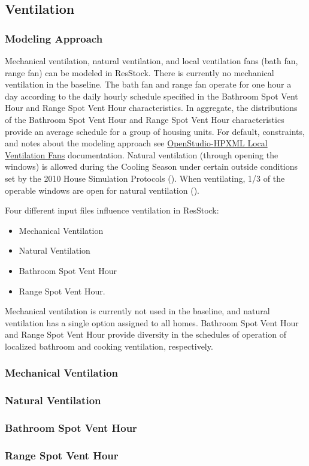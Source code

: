 \subsection{Ventilation}
\subsubsection{Modeling Approach}
Mechanical ventilation, natural ventilation, and local ventilation fans (bath fan, range fan) can be modeled in ResStock. There is currently no mechanical ventilation in the baseline.  The bath fan and range fan operate for one hour a day according to the daily hourly schedule specified in the Bathroom Spot Vent Hour and Range Spot Vent Hour characteristics. In aggregate, the distributions of the Bathroom Spot Vent Hour and Range Spot Vent Hour characteristics provide an average schedule for a group of housing units. For default, constraints, and notes about the modeling approach see \href{https://openstudio-hpxml.readthedocs.io/en/v1.10.0/workflow_inputs.html#hpxml-local-ventilation-fans}{OpenStudio-HPXML Local Ventilation Fans} documentation. Natural ventilation (through opening the windows) is allowed during the Cooling Season under certain outside conditions set by the 2010 House Simulation Protocols (\cite{bahsp_2010}). When ventilating, 1/3 of the operable windows are open for natural ventilation (\cite{bahsp_2010}).

Four different input files influence ventilation in ResStock:
\begin{itemize}
    \item Mechanical Ventilation
    \item Natural Ventilation
    \item Bathroom Spot Vent Hour
    \item Range Spot Vent Hour.
\end{itemize}

Mechanical ventilation is currently not used in the baseline, and natural ventilation has a single option assigned to all homes. Bathroom Spot Vent Hour and Range Spot Vent Hour provide diversity in the schedules of operation of localized bathroom and cooking ventilation, respectively.

\subsubsection{Mechanical Ventilation}


\subsubsection{Natural Ventilation}


\subsubsection{Bathroom Spot Vent Hour}


\subsubsection{Range Spot Vent Hour} \label{range_spot_vent_hour}

